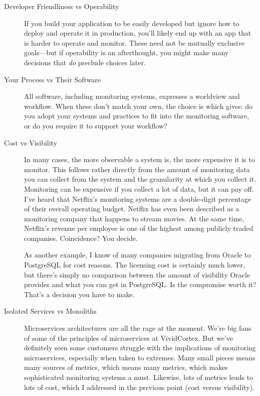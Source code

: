 \documentclass{vivid_layout}
\begin{document}
\begin{description}

\item[Developer Friendliness vs Operability] If you build your application to be
easily developed but ignore how to deploy and operate it in production, you'll
likely end up with an app that is harder to operate and monitor. These need not
be mutually exclusive goals---but if operability is an afterthought, you might
make many decisions that \emph{do} preclude choices later.

\item[Your Process vs Their Software] All software, including monitoring
systems, expresses a worldview and workflow. When these don't match your own,
the choice is which gives: do you adopt your systems and practices to fit into
the monitoring software, or do you require it to support your workflow?

\item[Cost vs Visibility] In many cases, the more observable a system is, the
more expensive it is to monitor. This follows rather directly from the amount of
monitoring data you can collect from the system and the granularity at which you
collect it. Monitoring can be expensive if you collect a lot of data, but it can
pay off. I've heard that Netflix's monitoring systems are a double-digit
percentage of their overall operating budget. Netflix has even been described as
a monitoring company that happens to stream movies. At the same time, Netflix's
revenue per employee is one of the highest among publicly traded companies.
Coincidence? You decide.

As another example, I know of many companies migrating from Oracle to PostgreSQL
for cost reasons. The licensing cost is certainly much lower, but there's simply
no comparison between the amount of visibility Oracle provides and what you can
get in PostgreSQL. Is the compromise worth it? That's a decision you have to
make.

\item[Isolated Services vs Monoliths] Microservices architectures are all the
rage at the moment. We're big fans of some of the principles of microservices at
VividCortex. But we've definitely seen some customers struggle with the
implications of monitoring microservices, especially when taken to extremes.
Many small pieces means many sources of metrics, which means many metrics, which
makes sophisticated monitoring systems a must. Likewise, lots of metrics leads
to lots of cost, which I addressed in the previous point (cost versus
visibility).


\end{description}
\end{document}
